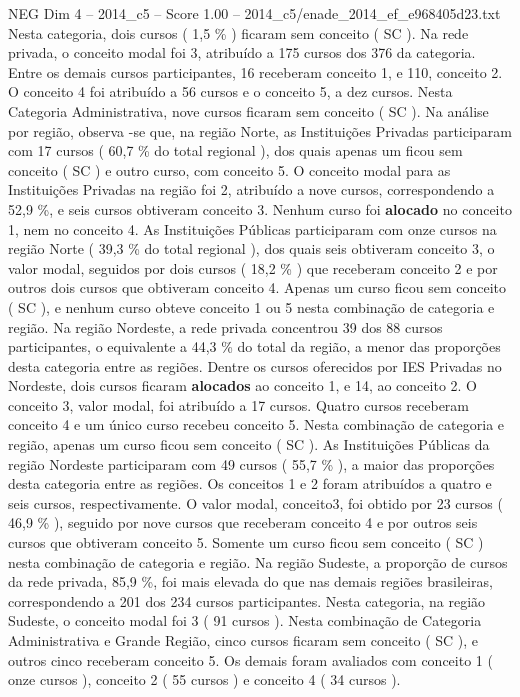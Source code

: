 \begin{textsample}{NEG Dim 4 – 2014\_c5 – Score 1.00 – 2014\_c5/enade\_2014\_ef\_e968405d23.txt}
Nesta categoria, dois cursos ( 1,5 \% ) ficaram sem conceito ( SC ).
Na rede privada, o conceito modal foi 3, atribuído a 175 cursos dos 376 da categoria.
Entre os demais cursos participantes, 16 receberam conceito 1, e 110, conceito 2.
O conceito 4 foi atribuído a 56 cursos e o conceito 5, a dez cursos.
Nesta Categoria Administrativa, nove cursos ficaram sem conceito ( SC ).
Na análise por região, observa -se que, na região Norte, as Instituições Privadas participaram com 17 cursos ( 60,7 \% do total regional ), dos quais apenas um ficou sem conceito ( SC ) e outro curso, com conceito 5.
O conceito modal para as Instituições Privadas na região foi 2, atribuído a nove cursos, correspondendo a 52,9 \%, e seis cursos obtiveram conceito 3.
Nenhum curso foi \textbf{alocado} no conceito 1, nem no conceito 4.
As Instituições Públicas participaram com onze cursos na região Norte ( 39,3 \% do total regional ), dos quais seis obtiveram conceito 3, o valor modal, seguidos por dois cursos ( 18,2 \% ) que receberam conceito 2 e por outros dois cursos que obtiveram conceito 4.
Apenas um curso ficou sem conceito ( SC ), e nenhum curso obteve conceito 1 ou 5 nesta combinação de categoria e região.
Na região Nordeste, a rede privada concentrou 39 dos 88 cursos participantes, o equivalente a 44,3 \% do total da região, a menor das proporções desta categoria entre as regiões.
Dentre os cursos oferecidos por IES Privadas no Nordeste, dois cursos ficaram \textbf{alocados} ao conceito 1, e 14, ao conceito 2.
O conceito 3, valor modal, foi atribuído a 17 cursos.
Quatro cursos receberam conceito 4 e um único curso recebeu conceito 5.
Nesta combinação de categoria e região, apenas um curso ficou sem conceito ( SC ).
As Instituições Públicas da região Nordeste participaram com 49 cursos ( 55,7 \% ), a maior das proporções desta categoria entre as regiões.
Os conceitos 1 e 2 foram atribuídos a quatro e seis cursos, respectivamente.
O valor modal, conceito3, foi obtido por 23 cursos ( 46,9 \% ), seguido por nove cursos que receberam conceito 4 e por outros seis cursos que obtiveram conceito 5.
Somente um curso ficou sem conceito ( SC ) nesta combinação de categoria e região.
Na região Sudeste, a proporção de cursos da rede privada, 85,9 \%, foi mais elevada do que nas demais regiões brasileiras, correspondendo a 201 dos 234 cursos participantes.
Nesta categoria, na região Sudeste, o conceito modal foi 3 ( 91 cursos ).
Nesta combinação de Categoria Administrativa e Grande Região, cinco cursos ficaram sem conceito ( SC ), e outros cinco receberam conceito 5.
Os demais foram avaliados com conceito 1 ( onze cursos ), conceito 2 ( 55 cursos ) e conceito 4 ( 34 cursos ).

\end{textsample}
